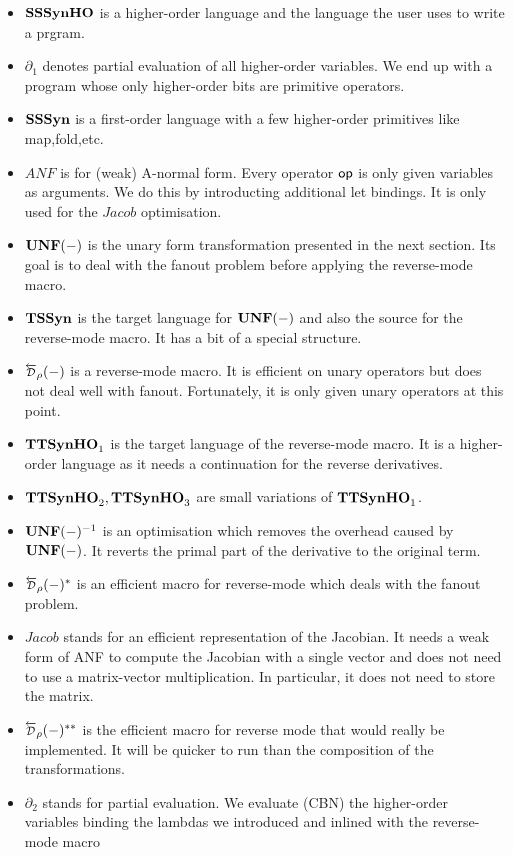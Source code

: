 \begin{itemize}
	\item $\mathbf{SSSynHO}$ is a higher-order language and the language the user uses to write a prgram.
	\item $\partial_1$ denotes partial evaluation of all higher-order variables. We end up with a program whose only higher-order bits are primitive operators.
	\item $\mathbf{SSSyn}$ is a first-order language with a few higher-order primitives like map,fold,etc.
	\item $ANF$ is for (weak) A-normal form. Every operator $\op$ is only given variables as arguments. We do this by introducting additional let bindings. It is only used for the $Jacob$ optimisation.
	\item $\mathbf{UNF}(-)$ is the unary form transformation presented in the next section. Its goal is to deal with the fanout problem before applying the reverse-mode macro.
	\item $\mathbf{TSSyn}$ is the target language for $\mathbf{UNF}(-)$ and also the source for the reverse-mode macro. It has a bit of a special structure.
	\item $\Dsynrev[\rho]{-}$ is a reverse-mode macro. It is efficient on unary operators but does not deal well with fanout. Fortunately, it is only given unary operators at this point.
	\item $\mathbf{TTSynHO}_1$ is the target language of the reverse-mode macro. It is a higher-order language as it needs a continuation for the reverse derivatives.
	\item $\mathbf{TTSynHO}_2,\mathbf{TTSynHO}_3$ are small variations of $\mathbf{TTSynHO}_1$.
	\item $\mathbf{UNF}(-)^{-1}$ is an optimisation which removes the overhead caused by $\mathbf{UNF}(-)$. It reverts the primal part of the derivative to the original term.
	\item $\Dsynrev[\rho]{-}^*$ is an efficient macro for reverse-mode which deals with the fanout problem.
	\item $Jacob$ stands for an efficient representation of the Jacobian. It needs a weak form of ANF to compute the Jacobian with a single vector and does not need to use a matrix-vector multiplication. In particular, it does not need to store the matrix.
	\item $\Dsynrev[\rho]{-}^{**}$ is the efficient macro for reverse mode that would really be implemented. It will be quicker to run than the composition of the transformations. 
	\item $\partial_2$ stands for partial evaluation. We evaluate (CBN) the higher-order variables binding the lambdas we introduced and inlined with the reverse-mode macro

\end{itemize}
